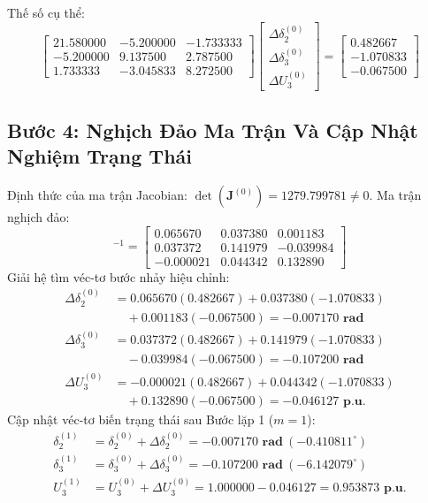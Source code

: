 \documentclass[12pt,a4paper,oneside]{report}
\begin{document}
Thế số cụ thể:
\begin{equation}
\begin{bmatrix}
21.580000 & -5.200000 & -1.733333 \\
-5.200000 & 9.137500 & 2.787500 \\
1.733333 & -3.045833 & 8.272500
\end{bmatrix}
\begin{bmatrix}
\Delta \delta_2^{(0)} \\[3pt]
\Delta \delta_3^{(0)} \\[3pt]
\Delta U_3^{(0)}
\end{bmatrix}
=
\begin{bmatrix}
0.482667 \\[3pt]
-1.070833 \\[3pt]
-0.067500
\end{bmatrix}
\end{equation}

\subsection{Bước 4: Nghịch Đảo Ma Trận Và Cập Nhật Nghiệm Trạng Thái}
Định thức của ma trận Jacobian: $\det(\mathbf{J}^{(0)}) = 1279.799781 \ne 0$. Ma trận nghịch đảo:
\begin{equation}
[\mathbf{J}^{(0)}]^{-1} = 
\begin{bmatrix}
0.065670 & 0.037380 & 0.001183 \\
0.037372 & 0.141979 & -0.039984 \\
-0.000021 & 0.044342 & 0.132890
\end{bmatrix}
\end{equation}
Giải hệ tìm véc-tơ bước nhảy hiệu chỉnh:
\begin{align}
\Delta \delta_2^{(0)} &= 0.065670(0.482667) + 0.037380(-1.070833) \nonumber \\
&\quad + 0.001183(-0.067500) = \mathbf{-0.007170\text{ rad}} \\
\Delta \delta_3^{(0)} &= 0.037372(0.482667) + 0.141979(-1.070833) \nonumber \\
&\quad - 0.039984(-0.067500) = \mathbf{-0.107200\text{ rad}} \\
\Delta U_3^{(0)} &= -0.000021(0.482667) + 0.044342(-1.070833) \nonumber \\
&\quad + 0.132890(-0.067500) = \mathbf{-0.046127\text{ p.u.}}
\end{align}
Cập nhật véc-tơ biến trạng thái sau Bước lặp 1 ($m = 1$):
\begin{align}
\delta_2^{(1)} &= \delta_2^{(0)} + \Delta \delta_2^{(0)} = \mathbf{-0.007170\text{ rad}}\ (-0.410811^\circ) \\
\delta_3^{(1)} &= \delta_3^{(0)} + \Delta \delta_3^{(0)} = \mathbf{-0.107200\text{ rad}}\ (-6.142079^\circ) \\
U_3^{(1)} &= U_3^{(0)} + \Delta U_3^{(0)} = 1.000000 - 0.046127 = \mathbf{0.953873\text{ p.u.}}
\end{align}
\end{document}
